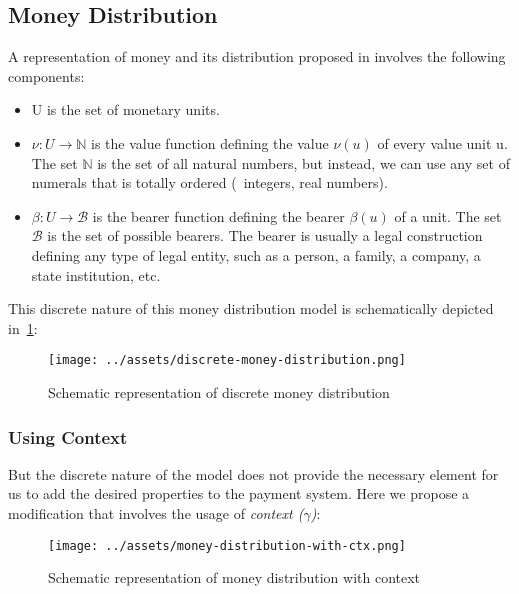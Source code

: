 \subsection{Money Distribution}

A representation of money and its distribution proposed in \cite{buldas2021unifying} involves the
following components:

\begin{itemize}
    \item U is the set of monetary units.

    \item $\nu : U \rightarrow \mathbb{N}$ is the value function defining the value $\nu(u)$ of
every value unit u. The set $\mathbb{N}$ is the set of all natural numbers, but instead, we can use
any set of numerals that is totally ordered (\eg\ integers, real numbers).

    \item $\beta : U \rightarrow \mathcal{B}$ is the bearer function defining the bearer $\beta(u)$
of a unit. The set $\mathcal{B}$ is the set of possible bearers. The bearer is usually a legal
construction defining any type of legal entity, such as a person, a family, a company, a state
institution, etc.
\end{itemize}

This discrete nature of this money distribution model is schematically depicted
in~\ref{fig:discrete-md}:

\begin{figure}[h]
    \centering
    \texttt{[image: ../assets/discrete-money-distribution.png]}
    \caption{Schematic representation of discrete money distribution}
    \label{fig:discrete-md}
\end{figure}

\subsubsection{Using Context}

But the discrete nature of the model does not provide the necessary element for us to add the
desired properties to the payment system. Here we propose a modification that involves the usage
of \textit{context ($\gamma$)}:

\begin{figure}[h]
    \centering
    \texttt{[image: ../assets/money-distribution-with-ctx.png]}
    \caption{Schematic representation of money distribution with context}
    \label{fig:md-with-ctx}
\end{figure}

